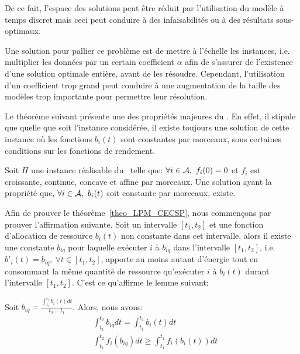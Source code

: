 De ce fait, l'espace des solutions peut être réduit par l'utilisation
du modèle à temps discret mais ceci peut conduire à des infaisabilités ou
à des résultats sous-optimaux.

Une solution pour pallier ce problème est de mettre à l'échelle les
instances, i.e. multiplier les données par un certain coefficient $\alpha$
afin de s'assurer de l'existence d'une solution optimale entière,
avant de les résoudre. Cependant, l'utilisation d'un coefficient trop
grand peut conduire à une augmentation de la taille des modèles trop
importante pour permettre leur résolution. 

Le théorème suivant présente une des propriétés majeures du \CECSP. En
effet, il stipule que quelle que soit l'instance considérée, il existe
toujours une solution de cette instance où les fonctions $b_i(t)$ sont
constantes par morceaux, sous certaines conditions sur les fonctions de
rendement.  

\begin{theo}
\label{theo_LPM_CECSP}
Soit $\Pi$ une instance réalisable du \CECSP~telle que: $\forall i \in
{\cal A},\ f_i(0) =0$ et $f_i$ est croissante, continue, concave et affine
par morceaux. Une solution ayant la propriété que, $\forall i \in {\cal A},\
b_i(t)$ soit constante par morceaux, existe.
\end{theo}

Afin de prouver le théorème~\ref{theo_LPM_CECSP}, nous commençons par
prouver l'affirmation suivante. Soit un intervalle $[t_1,t_2]$ et une
fonction d'allocation de ressource $b_i(t)$ non constante dans cet
intervalle, alors il existe une constante $b_{iq}$ pour laquelle
exécuter $i$ à $b_{iq}$ dans l'intervalle $[t_1,t_2]$,
i.e. $b'_i(t)=b_{iq},\ \forall t \in [t_1,t_2]$, apporte au moins
autant d'énergie tout en consommant la même quantité de ressource
qu'exécuter $i$ à $b_i(t)$ durant l'intervalle $[t_1,t_2]$. C'est ce
qu'affirme le lemme suivant:

\begin{lemma}
\label{lemmaEn}
Soit $b_{iq}= \frac{\int_{t_1}^{t_2}b_i(t)dt}{t_2-t_1}$. Alors, nous
avons:
\begin{align}
  &\int_{t_1}^{t_2}b_{iq}dt = \int_{t_1}^{t_2} b_i(t) dt \label{eq_LPM_res} \\
  & \int_{t_1}^{t_2}f_i(b_{iq})dt \ge \int_{t_1}^{t_2} f_i(b_i(t)) dt 
    \label{eq_LPM_nrj}
\end{align}
\end{lemma}

